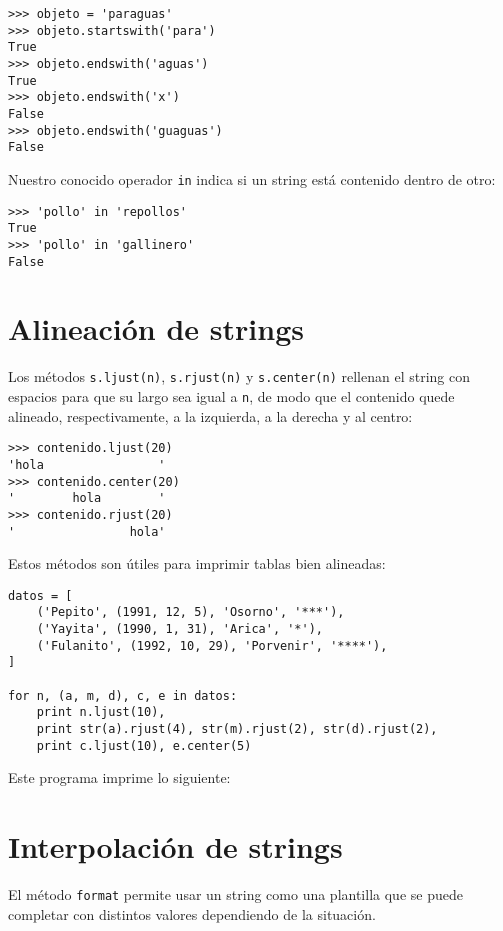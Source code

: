 \begin{lstlisting}
>>> objeto = 'paraguas'
>>> objeto.startswith('para')
True
>>> objeto.endswith('aguas')
True
>>> objeto.endswith('x')
False
>>> objeto.endswith('guaguas')
False
\end{lstlisting}

Nuestro conocido operador \lstinline!in! indica si un string está
contenido dentro de otro:

\begin{lstlisting}
>>> 'pollo' in 'repollos'
True
>>> 'pollo' in 'gallinero'
False
\end{lstlisting}

\section{Alineación de strings}

Los métodos \lstinline!s.ljust(n)!, \lstinline!s.rjust(n)! y
\lstinline!s.center(n)! rellenan el string con espacios para que su
largo sea igual a \lstinline!n!, de modo que el contenido quede
alineado, respectivamente, a la izquierda, a la derecha y al centro:

\begin{lstlisting}
>>> contenido.ljust(20)
'hola                '
>>> contenido.center(20)
'        hola        '
>>> contenido.rjust(20)
'                hola'
\end{lstlisting}

Estos métodos son útiles para imprimir tablas bien alineadas:

\begin{lstlisting}
datos = [
    ('Pepito', (1991, 12, 5), 'Osorno', '***'),
    ('Yayita', (1990, 1, 31), 'Arica', '*'),
    ('Fulanito', (1992, 10, 29), 'Porvenir', '****'),
]

for n, (a, m, d), c, e in datos:
    print n.ljust(10),
    print str(a).rjust(4), str(m).rjust(2), str(d).rjust(2),
    print c.ljust(10), e.center(5)
\end{lstlisting}

Este programa imprime lo siguiente:

\section{Interpolación de strings}

El método \lstinline!format! permite usar un string como una plantilla
que se puede completar con distintos valores dependiendo de la
situación.

